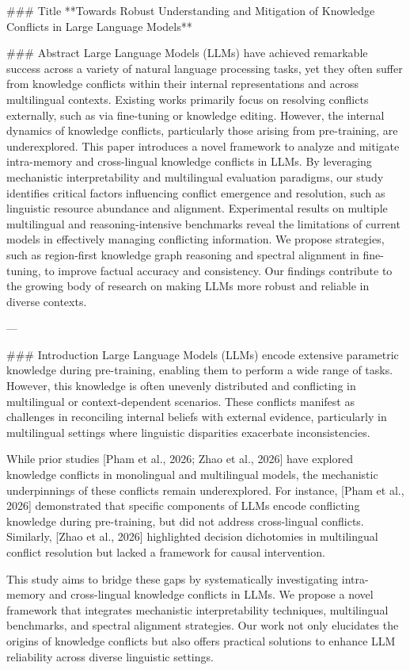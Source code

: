 ### Title
**Towards Robust Understanding and Mitigation of Knowledge Conflicts in Large Language Models**

### Abstract
Large Language Models (LLMs) have achieved remarkable success across a variety of natural language processing tasks, yet they often suffer from knowledge conflicts within their internal representations and across multilingual contexts. Existing works primarily focus on resolving conflicts externally, such as via fine-tuning or knowledge editing. However, the internal dynamics of knowledge conflicts, particularly those arising from pre-training, are underexplored. This paper introduces a novel framework to analyze and mitigate intra-memory and cross-lingual knowledge conflicts in LLMs. By leveraging mechanistic interpretability and multilingual evaluation paradigms, our study identifies critical factors influencing conflict emergence and resolution, such as linguistic resource abundance and alignment. Experimental results on multiple multilingual and reasoning-intensive benchmarks reveal the limitations of current models in effectively managing conflicting information. We propose strategies, such as region-first knowledge graph reasoning and spectral alignment in fine-tuning, to improve factual accuracy and consistency. Our findings contribute to the growing body of research on making LLMs more robust and reliable in diverse contexts.

---

### Introduction
Large Language Models (LLMs) encode extensive parametric knowledge during pre-training, enabling them to perform a wide range of tasks. However, this knowledge is often unevenly distributed and conflicting in multilingual or context-dependent scenarios. These conflicts manifest as challenges in reconciling internal beliefs with external evidence, particularly in multilingual settings where linguistic disparities exacerbate inconsistencies.

While prior studies [Pham et al., 2026; Zhao et al., 2026] have explored knowledge conflicts in monolingual and multilingual models, the mechanistic underpinnings of these conflicts remain underexplored. For instance, [Pham et al., 2026] demonstrated that specific components of LLMs encode conflicting knowledge during pre-training, but did not address cross-lingual conflicts. Similarly, [Zhao et al., 2026] highlighted decision dichotomies in multilingual conflict resolution but lacked a framework for causal intervention.

This study aims to bridge these gaps by systematically investigating intra-memory and cross-lingual knowledge conflicts in LLMs. We propose a novel framework that integrates mechanistic interpretability techniques, multilingual benchmarks, and spectral alignment strategies. Our work not only elucidates the origins of knowledge conflicts but also offers practical solutions to enhance LLM reliability across diverse linguistic settings.

